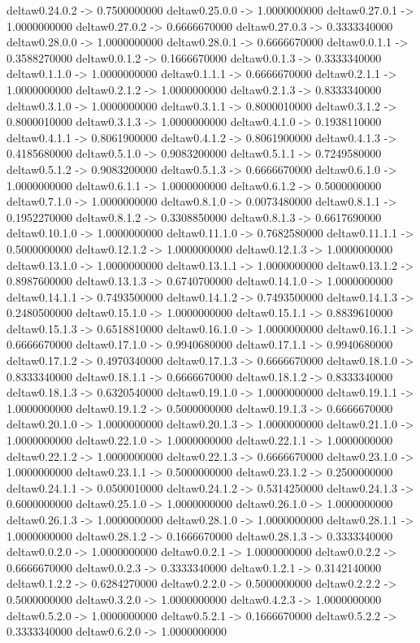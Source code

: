 deltaw0.24.0.2 -> 0.7500000000    deltaw0.25.0.0 -> 1.0000000000    deltaw0.27.0.1 -> 1.0000000000    deltaw0.27.0.2 -> 0.6666670000    deltaw0.27.0.3 -> 0.3333340000    deltaw0.28.0.0 -> 1.0000000000    deltaw0.28.0.1 -> 0.6666670000    deltaw0.0.1.1 -> 0.3588270000    deltaw0.0.1.2 -> 0.1666670000    deltaw0.0.1.3 -> 0.3333340000    deltaw0.1.1.0 -> 1.0000000000    deltaw0.1.1.1 -> 0.6666670000    deltaw0.2.1.1 -> 1.0000000000    deltaw0.2.1.2 -> 1.0000000000    deltaw0.2.1.3 -> 0.8333340000    deltaw0.3.1.0 -> 1.0000000000    deltaw0.3.1.1 -> 0.8000010000    deltaw0.3.1.2 -> 0.8000010000    deltaw0.3.1.3 -> 1.0000000000    deltaw0.4.1.0 -> 0.1938110000    deltaw0.4.1.1 -> 0.8061900000    deltaw0.4.1.2 -> 0.8061900000    deltaw0.4.1.3 -> 0.4185680000    deltaw0.5.1.0 -> 0.9083200000    deltaw0.5.1.1 -> 0.7249580000    deltaw0.5.1.2 -> 0.9083200000    deltaw0.5.1.3 -> 0.6666670000    deltaw0.6.1.0 -> 1.0000000000    deltaw0.6.1.1 -> 1.0000000000    deltaw0.6.1.2 -> 0.5000000000    deltaw0.7.1.0 -> 1.0000000000    deltaw0.8.1.0 -> 0.0073480000    deltaw0.8.1.1 -> 0.1952270000    deltaw0.8.1.2 -> 0.3308850000    deltaw0.8.1.3 -> 0.6617690000    deltaw0.10.1.0 -> 1.0000000000    deltaw0.11.1.0 -> 0.7682580000    deltaw0.11.1.1 -> 0.5000000000    deltaw0.12.1.2 -> 1.0000000000    deltaw0.12.1.3 -> 1.0000000000    deltaw0.13.1.0 -> 1.0000000000    deltaw0.13.1.1 -> 1.0000000000    deltaw0.13.1.2 -> 0.8987600000    deltaw0.13.1.3 -> 0.6740700000    deltaw0.14.1.0 -> 1.0000000000    deltaw0.14.1.1 -> 0.7493500000    deltaw0.14.1.2 -> 0.7493500000    deltaw0.14.1.3 -> 0.2480500000    deltaw0.15.1.0 -> 1.0000000000    deltaw0.15.1.1 -> 0.8839610000    deltaw0.15.1.3 -> 0.6518810000    deltaw0.16.1.0 -> 1.0000000000    deltaw0.16.1.1 -> 0.6666670000    deltaw0.17.1.0 -> 0.9940680000    deltaw0.17.1.1 -> 0.9940680000    deltaw0.17.1.2 -> 0.4970340000    deltaw0.17.1.3 -> 0.6666670000    deltaw0.18.1.0 -> 0.8333340000    deltaw0.18.1.1 -> 0.6666670000    deltaw0.18.1.2 -> 0.8333340000    deltaw0.18.1.3 -> 0.6320540000    deltaw0.19.1.0 -> 1.0000000000    deltaw0.19.1.1 -> 1.0000000000    deltaw0.19.1.2 -> 0.5000000000    deltaw0.19.1.3 -> 0.6666670000    deltaw0.20.1.0 -> 1.0000000000    deltaw0.20.1.3 -> 1.0000000000    deltaw0.21.1.0 -> 1.0000000000    deltaw0.22.1.0 -> 1.0000000000    deltaw0.22.1.1 -> 1.0000000000    deltaw0.22.1.2 -> 1.0000000000    deltaw0.22.1.3 -> 0.6666670000    deltaw0.23.1.0 -> 1.0000000000    deltaw0.23.1.1 -> 0.5000000000    deltaw0.23.1.2 -> 0.2500000000    deltaw0.24.1.1 -> 0.0500010000    deltaw0.24.1.2 -> 0.5314250000    deltaw0.24.1.3 -> 0.6000000000    deltaw0.25.1.0 -> 1.0000000000    deltaw0.26.1.0 -> 1.0000000000    deltaw0.26.1.3 -> 1.0000000000    deltaw0.28.1.0 -> 1.0000000000    deltaw0.28.1.1 -> 1.0000000000    deltaw0.28.1.2 -> 0.1666670000    deltaw0.28.1.3 -> 0.3333340000    deltaw0.0.2.0 -> 1.0000000000    deltaw0.0.2.1 -> 1.0000000000    deltaw0.0.2.2 -> 0.6666670000    deltaw0.0.2.3 -> 0.3333340000    deltaw0.1.2.1 -> 0.3142140000    deltaw0.1.2.2 -> 0.6284270000    deltaw0.2.2.0 -> 0.5000000000    deltaw0.2.2.2 -> 0.5000000000    deltaw0.3.2.0 -> 1.0000000000    deltaw0.4.2.3 -> 1.0000000000    deltaw0.5.2.0 -> 1.0000000000    deltaw0.5.2.1 -> 0.1666670000    deltaw0.5.2.2 -> 0.3333340000    deltaw0.6.2.0 -> 1.0000000000    